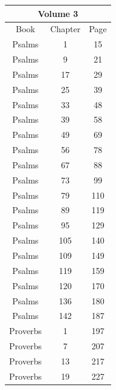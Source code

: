 \documentclass{article}
\newlength{\minipageheight}
\newlength{\minipagewidth}
\begin{document}


\begin{minipage}[l][\minipageheight][t]{\minipagewidth}%
    \begin{center}
        \renewcommand{\arraystretch}{1.0}
        \begin{tabular}{|c|c|c|}
            \hline
            \multicolumn{3}{|c|}{Volume 3}   \\
            \hline
            Book            & Chapter & Page \\
            \hline
            Psalms          & 1       & 15   \\
            Psalms          & 9       & 21   \\
            Psalms          & 17      & 29   \\
            Psalms          & 25      & 39   \\
            Psalms          & 33      & 48   \\
            Psalms          & 39      & 58   \\
            Psalms          & 49      & 69   \\
            Psalms          & 56      & 78   \\
            Psalms          & 67      & 88   \\
            Psalms          & 73      & 99   \\
            Psalms          & 79      & 110  \\
            Psalms          & 89      & 119  \\
            Psalms          & 95      & 129  \\
            Psalms          & 105     & 140  \\
            Psalms          & 109     & 149  \\
            Psalms          & 119     & 159  \\
            Psalms          & 120     & 170  \\
            Psalms          & 136     & 180  \\
            Psalms          & 142     & 187  \\
            Proverbs        & 1       & 197  \\
            Proverbs        & 7       & 207  \\
            Proverbs        & 13      & 217  \\
            Proverbs        & 19      & 227  \\

\end{tabular}
\end{center}
\end{minipage}
\end{document}
